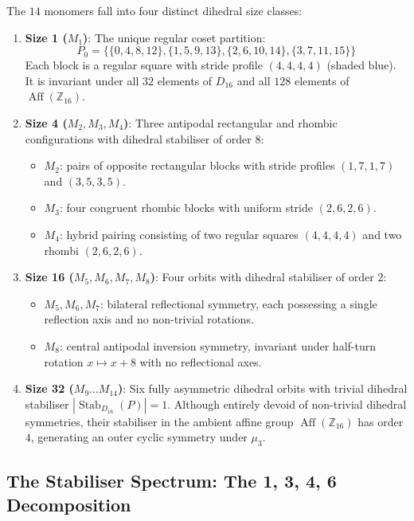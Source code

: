The $14$ monomers fall into four distinct dihedral size classes:
\begin{enumerate}
    \item \textbf{Size 1 ($M_1$)}:
    The unique regular coset partition:
    \[
    P_0 = \{\{0, 4, 8, 12\}, \{1, 5, 9, 13\}, \{2, 6, 10, 14\}, \{3, 7, 11, 15\}\}
    \]
    Each block is a regular square with stride profile $(4, 4, 4, 4)$ (shaded blue). It is invariant under all $32$ elements of $D_{16}$ and all $128$ elements of $\operatorname{Aff}(\mathbb{Z}_{16})$.
    
    \item \textbf{Size 4 ($M_2, M_3, M_4$)}:
    Three antipodal rectangular and rhombic configurations with dihedral stabiliser of order $8$:
    \begin{itemize}
        \item $M_2$: pairs of opposite rectangular blocks with stride profiles $(1, 7, 1, 7)$ and $(3, 5, 3, 5)$.
        \item $M_3$: four congruent rhombic blocks with uniform stride $(2, 6, 2, 6)$.
        \item $M_4$: hybrid pairing consisting of two regular squares $(4, 4, 4, 4)$ and two rhombi $(2, 6, 2, 6)$.
    \end{itemize}
    
    \item \textbf{Size 16 ($M_5, M_6, M_7, M_8$)}:
    Four orbits with dihedral stabiliser of order $2$:
    \begin{itemize}
        \item $M_5, M_6, M_7$: bilateral reflectional symmetry, each possessing a single reflection axis and no non-trivial rotations.
        \item $M_8$: central antipodal inversion symmetry, invariant under half-turn rotation $x \mapsto x + 8$ with no reflectional axes.
    \end{itemize}
    
    \item \textbf{Size 32 ($M_9 \dots M_{14}$)}:\newline
    Six fully asymmetric dihedral orbits with trivial dihedral stabiliser $|\operatorname{Stab}_{D_{16}}(P)| = 1$. Although entirely devoid of non-trivial dihedral symmetries, their stabiliser in the ambient affine group $\operatorname{Aff}(\mathbb{Z}_{16})$ has order $4$, generating an outer cyclic symmetry under $\mu_3$.
\end{enumerate}

\subsection{The Stabiliser Spectrum: The 1, 3, 4, 6 Decomposition}

